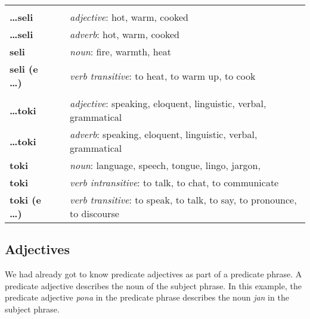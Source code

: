 \begin{supertabular}{p{2,5cm}|ll}
                               &  &                                                                                         \\
    \textbf{\dots seli}        &  & \textit{adjective}: hot, warm, cooked                                                   \\
    \textbf{\dots seli}        &  & \textit{adverb}: hot, warm, cooked                                                      \\
    \textbf{seli}              &  & \textit{noun}: fire, warmth, heat                                                       \\
    \textbf{seli (e \dots)}    &  & \textit{verb transitive}: to heat, to warm up, to cook                                  \\
                               &  &                                                                                         \\
    \textbf{\dots toki}        &  & \textit{adjective}: speaking, eloquent, linguistic, verbal, grammatical                 \\
    \textbf{\dots toki}        &  & \textit{adverb}: speaking, eloquent, linguistic, verbal, grammatical                    \\
    \textbf{toki}              &  & \textit{noun}: language, speech, tongue, lingo, jargon,                                 \\
    \textbf{toki}              &  & \textit{verb intransitive}: to talk, to chat, to communicate                            \\
    \textbf{toki (e \dots)}    &  & \textit{verb transitive}: to speak, to talk, to say, to pronounce, to discourse         \\
\end{supertabular}

\newpage

\subsection*{Adjectives}
We had already got to know predicate adjectives as part of a predicate phrase.
A predicate adjective describes the noun of the subject phrase.
In this example, the predicate adjective \textit{pona} in the predicate phrase describes the noun \textit{jan} in the subject phrase.

